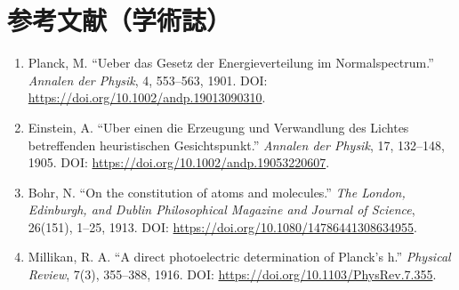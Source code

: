 \section*{参考文献（学術誌）}
\begin{enumerate}[leftmargin=2.4em]
\item Planck, M. ``Ueber das Gesetz der Energieverteilung im Normalspectrum.'' \textit{Annalen der Physik}, 4, 553--563, 1901. DOI: \url{https://doi.org/10.1002/andp.19013090310}.
\item Einstein, A. ``Uber einen die Erzeugung und Verwandlung des Lichtes betreffenden heuristischen Gesichtspunkt.'' \textit{Annalen der Physik}, 17, 132--148, 1905. DOI: \url{https://doi.org/10.1002/andp.19053220607}.
\item Bohr, N. ``On the constitution of atoms and molecules.'' \textit{The London, Edinburgh, and Dublin Philosophical Magazine and Journal of Science}, 26(151), 1--25, 1913. DOI: \url{https://doi.org/10.1080/14786441308634955}.
\item Millikan, R. A. ``A direct photoelectric determination of Planck's h.'' \textit{Physical Review}, 7(3), 355--388, 1916. DOI: \url{https://doi.org/10.1103/PhysRev.7.355}.
\end{enumerate}
